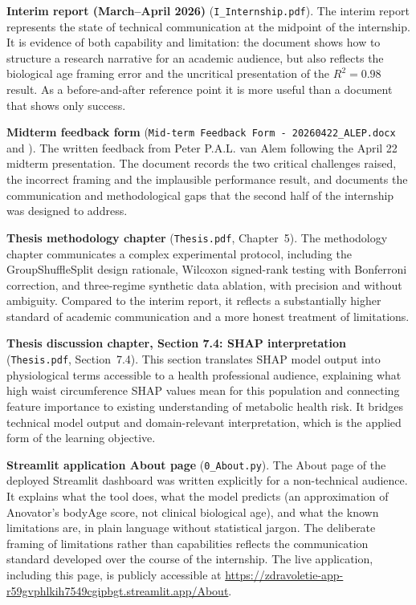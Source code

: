 \documentclass[11pt,a4paper]{report}
\begin{document}
\textbf{Interim report (March--April 2026)} (\texttt{I\_Internship.pdf}). The interim report
represents the state of technical communication at the midpoint of the internship. It is evidence
of both capability and limitation: the document shows how to structure a research narrative for an
academic audience, but also reflects the biological age framing error and the uncritical
presentation of the $R^2 = 0.98$ result. As a before-and-after reference point it is more useful
than a document that shows only success.

\textbf{Midterm feedback form}
(\texttt{Mid-term Feedback Form - 20260422\_ALEP.docx} and
). The
written feedback from Peter P.A.L. van Alem following the April 22 midterm presentation. The document records
the two critical challenges raised, the incorrect framing and the implausible performance result,
and documents the communication and methodological gaps that the second half of the internship was
designed to address.

\textbf{Thesis methodology chapter} (\texttt{Thesis.pdf}, Chapter~5). The methodology chapter
communicates a complex experimental protocol, including the GroupShuffleSplit design rationale,
Wilcoxon signed-rank testing with Bonferroni correction, and three-regime synthetic data ablation,
with precision and without ambiguity. Compared to the interim report, it reflects a
substantially higher standard of academic communication and a more honest treatment of limitations.

\textbf{Thesis discussion chapter, Section 7.4: SHAP interpretation}
(\texttt{Thesis.pdf}, Section~7.4). This section translates SHAP model output into physiological
terms accessible to a health professional audience, explaining what high waist circumference SHAP
values mean for this population and connecting feature importance to existing understanding of
metabolic health risk. It bridges technical model output and domain-relevant interpretation, which
is the applied form of the learning objective.

\textbf{Streamlit application About page} (\texttt{0\_About.py}). The About page of the
deployed Streamlit dashboard was written explicitly for a non-technical audience. It explains what
the tool does, what the model predicts (an approximation of Anovator's bodyAge score, not clinical
biological age), and what the known limitations are, in plain language without statistical jargon.
The deliberate framing of limitations rather than capabilities reflects the communication standard
developed over the course of the internship.
The live application, including this page, is publicly accessible at \url{https://zdravoletie-app-r59gvphlkih7549cgipbgt.streamlit.app/About}.
\end{document}
